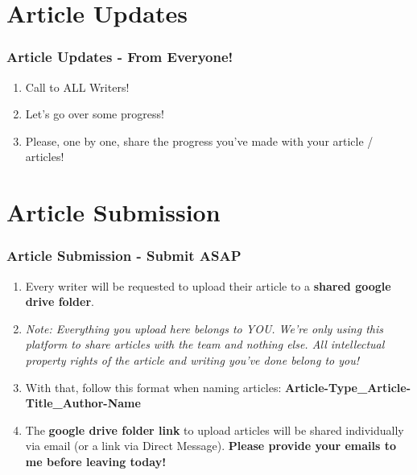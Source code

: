 \documentclass{beamer}
\begin{document}
\section{Article Updates}
\begin{frame}
    \frametitle{Article Updates - From Everyone!}

    \begin{enumerate}
        \item<1-> Call to ALL Writers!

        \item<2-> Let's go over some progress! 

        \item<3-> Please, one by one, share the progress you've made with your article / articles!

    \end{enumerate}
    
\end{frame}


\section{Article Submission}
\begin{frame}
    \frametitle{Article Submission - Submit ASAP}

    \begin{enumerate}
        \item<1-> Every writer will be requested to upload their article to a \textbf{shared google drive folder}.

        \item<2-> \emph{Note: Everything you upload here belongs to YOU. We're only using this platform to share articles with the team and nothing else. All intellectual property rights of the article and writing you've done belong to you!}

        \item<3-> With that, follow this format when naming articles: \textbf{Article-Type\_Article-Title\_Author-Name}

        \item<4-> The \textbf{google drive folder link} to upload articles will be shared individually via email (or a link via Direct Message). \textbf{Please provide your emails to me before leaving today!}

    \end{enumerate}

\end{frame}
\end{document}
